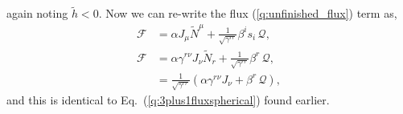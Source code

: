 again noting $\tilde h<0$. Now we can re-write the flux (\ref{q:unfinished_flux}) term as,
\begin{align}
\mathcal{F} &= \alpha J_\mu \tilde N^\mu +  \frac{1}{\sqrt{\gamma^{rr}}}\beta^i s_i\, \mathcal{Q} , \\
\mathcal{F} &= \alpha\gamma^{ r\nu} J_\nu \tilde N_r +  \frac{1}{\sqrt{\gamma^{rr}}}\beta^r \, \mathcal{Q} , \\
            &= \frac{1}{\sqrt{\gamma^{rr}}}( \alpha \gamma^{ r\nu} J_\nu +  \beta^r \, \mathcal{Q} ),
\end{align}
and this is identical to Eq.~(\ref{q:3plus1fluxspherical}) found earlier.








